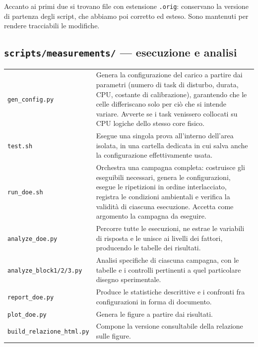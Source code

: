 Accanto ai primi due si trovano file con estensione \texttt{.orig}: conservano la versione di
partenza degli script, che abbiamo poi corretto ed esteso. Sono mantenuti per rendere tracciabili
le modifiche.

\subsection*{\texttt{scripts/measurements/} --- esecuzione e analisi}

\begin{center}\small
\begin{tabular}{p{4.3cm}p{10.0cm}}
\toprule
\texttt{gen\_config.py} & Genera la configurazione del carico a partire dai parametri (numero di
task di disturbo, durata, CPU, costante di calibrazione), garantendo che le celle differiscano solo
per ci\`o che si intende variare. Avverte se i task venissero collocati su CPU logiche dello stesso
core fisico. \\
\addlinespace
\texttt{test.sh} & Esegue una singola prova all'interno dell'area isolata, in una cartella dedicata
in cui salva anche la configurazione effettivamente usata. \\
\addlinespace
\texttt{run\_doe.sh} & Orchestra una campagna completa: costruisce gli eseguibili necessari, genera
le configurazioni, esegue le ripetizioni in ordine interlacciato, registra le condizioni ambientali
e verifica la validit\`a di ciascuna esecuzione. Accetta come argomento la campagna da eseguire. \\
\addlinespace
\texttt{analyze\_doe.py} & Percorre tutte le esecuzioni, ne estrae le variabili di risposta e le
unisce ai livelli dei fattori, producendo le tabelle dei risultati. \\
\addlinespace
\texttt{analyze\_block1/2/3.py} & Analisi specifiche di ciascuna campagna, con le tabelle e i
controlli pertinenti a quel particolare disegno sperimentale. \\
\addlinespace
\texttt{report\_doe.py} & Produce le statistiche descrittive e i confronti fra configurazioni in
forma di documento. \\
\addlinespace
\texttt{plot\_doe.py} & Genera le figure a partire dai risultati. \\
\addlinespace
\texttt{build\_relazione\_html.py} & Compone la versione consultabile della relazione sulle figure. \\
\bottomrule
\end{tabular}
\end{center}

